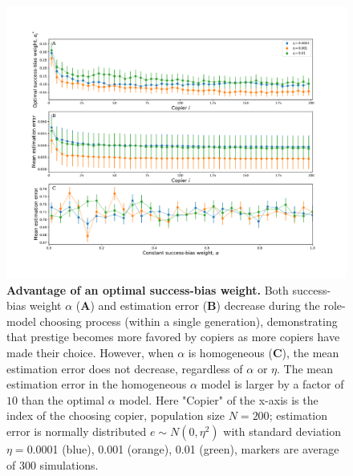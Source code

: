 \documentclass[12pt]{extarticle}
\begin{document}
\begin{figure}[h]
    \includegraphics[width=\linewidth]{choose_bias.pdf}
  \caption{
  \textbf{Advantage of an optimal success-bias weight.}
  Both success-bias weight $\alpha$ (\textbf{A}) and estimation error (\textbf{B}) decrease during the role-model choosing process (within a single generation), demonstrating that prestige becomes more favored by copiers as more copiers have made their choice.
However, when $\alpha$ is homogeneous (\textbf{C}), the mean estimation error does not decrease, regardless of $\alpha$ or $\eta$.
The mean estimation error in the homogeneous $\alpha$ model is larger by a factor of $10$ than the optimal $\alpha$ model.
Here "Copier" of the x-axis is the index of the choosing copier, population size $N=200$; estimation error is normally distributed $e \sim N(0,\eta^2)$ with standard deviation $\eta=$0.0001 (blue), 0.001 (orange), 0.01 (green), markers are average of $300$ simulations.
}	
  \label{fig:influence_advantage}
\end{figure}



\end{document}
